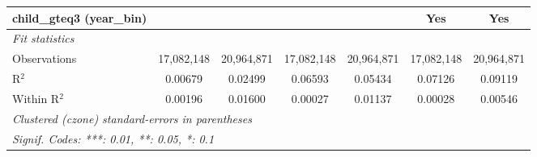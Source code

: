 \begin{tabular}{lcccccc}
child\_gteq3 (year\_bin) &  &  &  &  & Yes & Yes\\
\midrule \emph{Fit statistics}&  & & & & & \\
Observations & 17,082,148&20,964,871&17,082,148&20,964,871&17,082,148&20,964,871\\
R$^2$ & 0.00679&0.02499&0.06593&0.05434&0.07126&0.09119\\
Within R$^2$ & 0.00196&0.01600&0.00027&0.01137&0.00028&0.00546\\
\midrule\midrule\multicolumn{7}{l}{\emph{Clustered (czone) standard-errors in parentheses}}\\
\multicolumn{7}{l}{\emph{Signif. Codes: ***: 0.01, **: 0.05, *: 0.1}}\\
\end{tabular}


